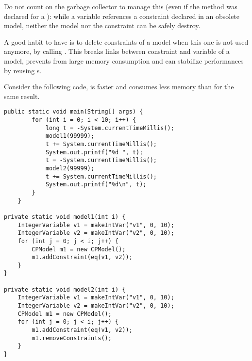 \vspace{1cm}
\begin{notedef}
Do not count on the garbage collector to manage this (even if the  method was declared for a ): while a variable references a constraint declared in an obsolete model, neither the model nor the constraint can be safely destroy. 

A good habit to have is to delete constraints of a model when this one is not used anymore, by calling . This breaks links between constraint and variable of a model, prevents from large memory consumption and can stabilize performances by reusing s.


Consider the following code,  is faster and consumes less memory than  for the same result.
\begin{lstlisting}
public static void main(String[] args) {
        for (int i = 0; i < 10; i++) {
            long t = -System.currentTimeMillis();
            model1(99999);
            t += System.currentTimeMillis();
            System.out.printf("%d ", t);
            t = -System.currentTimeMillis();
            model2(99999);
            t += System.currentTimeMillis();
            System.out.printf("%d\n", t);
        }
    }                                               
                                                 
private static void model1(int i) {              
    IntegerVariable v1 = makeIntVar("v1", 0, 10);
    IntegerVariable v2 = makeIntVar("v2", 0, 10);
    for (int j = 0; j < i; j++) {                
        CPModel m1 = new CPModel();              
        m1.addConstraint(eq(v1, v2));            
    }                                            
}                                                
                                                 
private static void model2(int i) {              
    IntegerVariable v1 = makeIntVar("v1", 0, 10);
    IntegerVariable v2 = makeIntVar("v2", 0, 10);
    CPModel m1 = new CPModel();                  
    for (int j = 0; j < i; j++) {                
        m1.addConstraint(eq(v1, v2));            
        m1.removeConstraints();                  
    }                                            
}                                                
\end{lstlisting}

\end{notedef}




